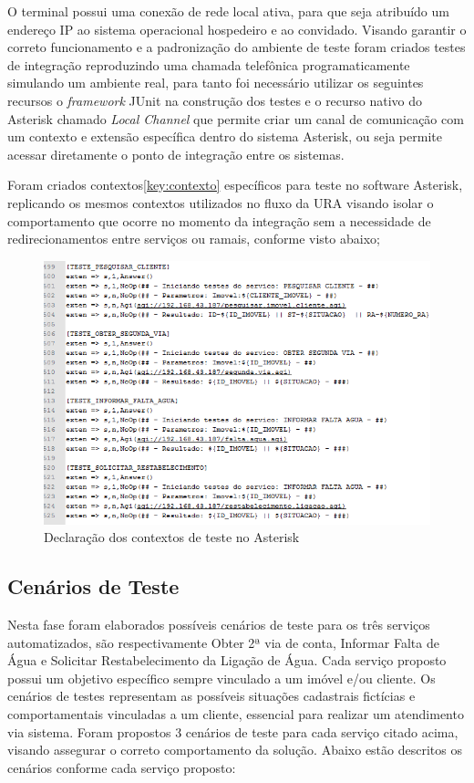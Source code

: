 O terminal possui uma conexão de rede local ativa, para que seja atribuído um endereço IP ao sistema operacional hospedeiro e ao convidado.
Visando garantir o correto funcionamento e a padronização do ambiente de teste foram criados testes de integração reproduzindo uma chamada telefônica programaticamente simulando um ambiente real, para tanto foi necessário utilizar os seguintes recursos o \textit{framework} JUnit na construção dos testes e o recurso nativo do Asterisk chamado \textit{Local Channel} que permite criar um canal de comunicação com um contexto e extensão específica dentro do sistema Asterisk, ou seja permite acessar diretamente o ponto de integração entre os sistemas.

Foram criados contextos\ref{key:contexto} específicos para teste no software Asterisk, replicando os mesmos contextos utilizados no fluxo da URA visando 
isolar o comportamento que ocorre no momento da integração sem a necessidade de redirecionamentos entre serviços ou ramais, conforme visto abaixo;

\begin{figure}[H]
	\centering
	\caption{Declaração dos contextos de teste no Asterisk}
	\label{figura:contextoTeste}
	\includegraphics{figuras/contexto_teste.png}
\end{figure}


\subsection{Cenários de Teste}
Nesta fase foram elaborados possíveis cenários de teste para os três serviços automatizados, são respectivamente Obter 2ª via de conta, Informar Falta de Água e Solicitar Restabelecimento da Ligação de Água. Cada serviço proposto possui um objetivo específico sempre vinculado a um imóvel e/ou cliente.
Os cenários de testes representam as possíveis situações cadastrais fictícias e comportamentais vinculadas a um cliente, essencial para realizar um atendimento via sistema. Foram propostos 3 cenários de teste para cada serviço citado acima, visando assegurar o correto comportamento da solução. Abaixo estão descritos os cenários conforme cada serviço proposto:

